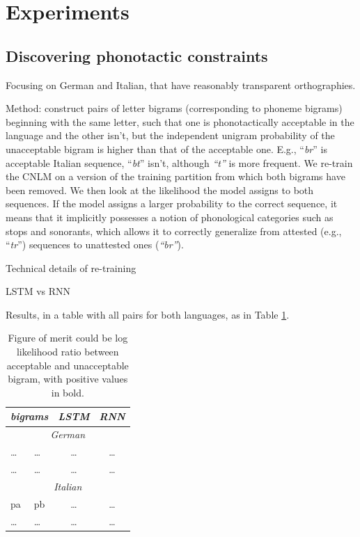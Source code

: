 \section{Experiments}
\label{sec:experiments}

\subsection{Discovering phonotactic constraints}
\label{sec:phonotactics}

Focusing on German and Italian, that have reasonably transparent
orthographies.

Method: construct pairs of letter bigrams (corresponding to phoneme
bigrams) beginning with the same letter, such that one is
phonotactically acceptable in the language and the other isn't, but
the independent unigram probability of the unacceptable bigram is
higher than that of the acceptable one. E.g., ``\emph{br}'' is
acceptable Italian sequence, ``\emph{bt}'' isn't, although
\emph{``t''} is more frequent. We re-train the CNLM on a version of
the training partition from which both bigrams have been removed. We then look at
the likelihood the model assigns to both sequences. If the model
assigns a larger probability to the correct sequence, it means that it
implicitly possesses a notion of phonological categories such as
stops and sonorants, which allows it to correctly generalize from
attested (e.g., ``\emph{tr}'') sequences to unattested ones
(\emph{``br''}).

Technical details of re-training

LSTM vs RNN

Results, in a table with all pairs for both languages, as in Table
\ref{tab:phonotactics-results}.

\begin{table}[t]
  \begin{center}
    \begin{tabular}{ll|cc}
      \multicolumn{2}{c}{\emph{bigrams}}&\emph{LSTM}&\emph{RNN}\\
      \hline
      \multicolumn{4}{c}{\emph{German}}\\
      \hline
      \ldots & \ldots & \ldots & \ldots \\
      \ldots & \ldots & \ldots & \ldots \\
      \hline
      \multicolumn{4}{c}{\emph{Italian}}\\
      \hline
      pa & pb & \ldots & \ldots \\
      \ldots & \ldots & \ldots & \ldots \\
    \end{tabular}
  \end{center}
  \caption{\label{tab:phonotactics-results} Figure of merit could be
    log likelihood ratio between acceptable and unacceptable bigram,
    with positive values in bold.}
\end{table}



